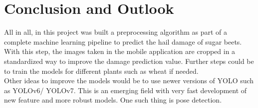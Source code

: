 
\chapter{Conclusion and Outlook}
All in all, in this project was built a preprocessing algorithm as part of a complete machine learning pipeline to predict the hail damage of sugar beets. With this step, the images taken in the mobile application are cropped in a standardized way to improve the damage prediction value. Further steps could be to train the models for different plants such as wheat if needed. \\

Other ideas to improve the models would be to use newer versions of YOLO such as YOLOv6/ YOLOv7. This is an emerging field with very fast development of new feature and more robust models. One such thing is pose detection.
